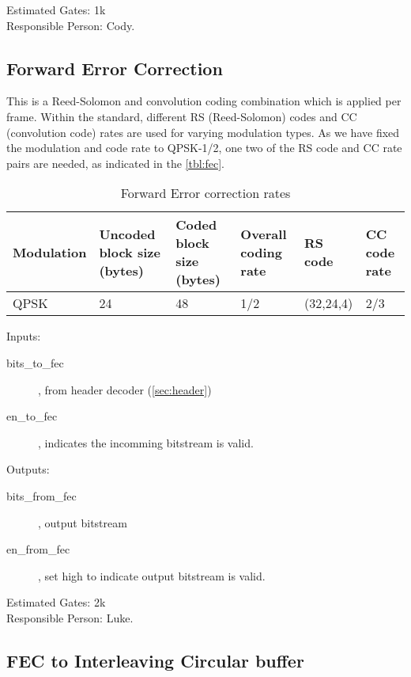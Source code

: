 \documentclass[dvips,10pt,twocolumn]{article}
\begin{document}
	Estimated Gates: 1k \\
	Responsible Person: Cody.

	\subsection{Forward Error Correction}
		\label{sec:fec}
		This is a Reed-Solomon and convolution coding combination
		which is applied per frame. Within the standard, different
		RS (Reed-Solomon) codes and CC (convolution code) rates are
		used for varying modulation types. As we have fixed the
		modulation and code rate to QPSK-1/2, one two of the RS
		code and CC rate pairs are needed, as indicated in the
		\autoref{tbl:fec}.
		
		\begin{table*}
			\begin{tabular}{p{2cm}|p{2cm}|p{2cm}|p{2cm}|p{2cm}|p{2cm}}
			\label{tbl:fec}
				Modulation & Uncoded block size (bytes) &
				Coded block size (bytes) & Overall coding
				rate & RS code & CC code rate \\ \hline
				QPSK & 24 & 48 & 1/2 & (32,24,4) & 2/3 \\
			\end{tabular}
			\caption{Forward Error correction rates}
		\end{table*}

		\begin{description}
			\item{Inputs:} \begin{description}
				\item[bits\_to\_fec], from header decoder
					(\autoref{sec:header})
				\item[en\_to\_fec], indicates the incomming
					bitstream is valid.
			\end{description}
			\item{Outputs:} \begin{description}
				\item[bits\_from\_fec], output bitstream
				\item[en\_from\_fec], set high to indicate
					output bitstream is valid.
			\end{description}
		\end{description}

		Estimated Gates: 2k \\
		Responsible Person: Luke.

	\subsection{FEC to Interleaving Circular buffer}
		\label{sec:fec_buffer}
\end{document}
